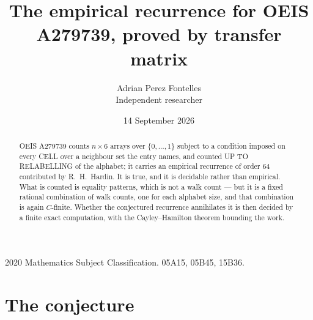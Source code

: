 \documentclass[11pt,a4paper]{article}
\title{The empirical recurrence for OEIS A279739, proved by transfer matrix}
\author{Adrian Perez Fontelles\\ \small Independent researcher}
\date{14 September 2026}
\theoremstyle{plain}
\theoremstyle{definition}
\begin{document}
\maketitle

\begin{abstract}
OEIS A279739 counts $n\times6$ arrays over $\{0,\dots,1\}$ subject to a condition imposed on
every CELL over a neighbour set the entry names, and counted UP TO RELABELLING of the
alphabet; it carries an empirical recurrence of order $64$ contributed by
R.~H.~Hardin. It is true, and it is decidable rather than empirical. What is counted is
equality patterns, which is not a walk count --- but it is a fixed rational combination of
walk counts, one for each alphabet size, and that combination is again $C$-finite. Whether the
conjectured recurrence annihilates it is then decided by a finite exact computation, with the
Cayley--Hamilton theorem bounding the work.
\end{abstract}

\noindent\small 2020 Mathematics Subject Classification. 05A15, 05B45, 15B36.\normalsize

\section{The conjecture}
\end{document}
